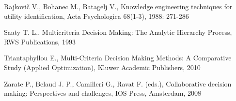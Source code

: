 \begin{description}
\item Rajkovič V., Bohanec M., Batagelj V., Knowledge engineering techniques for utility identification, Acta Psychologica 68(1-3), 1988: 271-286
\item Saaty T. L., Multicriteria Decision Making: The Analytic Hierarchy Process, RWS Publications, 1993
\item Triantaphyllou E., Multi-Criteria Decision Making Methods: A Comparative Study (Applied Optimization), Kluwer Academic Publishers, 2010
\item Zarate P., Belaud J. P., Camilleri G., Ravat  F. (eds.), Collaborative decision making: Perspectives and challenges, IOS Press, Amsterdam, 2008
\end{description}
